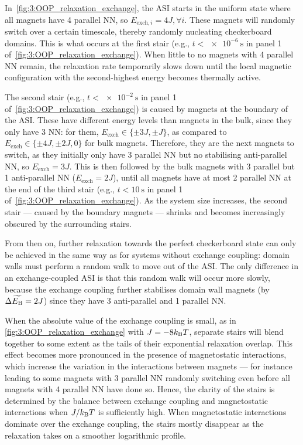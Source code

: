 In~\cref{fig:3:OOP_relaxation_exchange}, the ASI starts in the uniform state where all magnets have 4 parallel NN, so $E_{\mathrm{exch},i} = 4J, \forall i$.
These magnets will randomly switch over a certain timescale, thereby randomly nucleating checkerboard domains.
This is what occurs at the first stair (e.g., $t < \SI{e-6}{\second}$ in panel 1 of~\cref{fig:3:OOP_relaxation_exchange}).
When little to no magnets with 4 parallel NN remain, the relaxation rate temporarily slows down until the local magnetic configuration with the second-highest energy becomes thermally active. \par
The second stair (e.g., $t < \SI{e-2}{\second}$ in panel 1 of~\cref{fig:3:OOP_relaxation_exchange}) is caused by magnets at the boundary of the ASI.
These have different energy levels than magnets in the bulk, since they only have 3 NN: for them, $E_\mathrm{exch} \in \{\pm 3J, \pm J\}$, as compared to $E_\mathrm{exch} \in \{\pm 4J, \pm 2J, 0\}$ for bulk magnets.
Therefore, they are the next magnets to switch, as they initially only have 3 parallel NN but no stabilising anti-parallel NN, so $E_\mathrm{exch} = 3J$.
This is then followed by the bulk magnets with 3 parallel but 1 anti-parallel NN ($E_\mathrm{exch} = 2J$), until all magnets have at most 2 parallel NN at the end of the third stair (e.g., $t < \SI{10}{\second}$ in panel 1 of~\cref{fig:3:OOP_relaxation_exchange}).
As the system size increases, the second stair --- caused by the boundary magnets --- shrinks and becomes increasingly obscured by the surrounding stairs. \par
From then on, further relaxation towards the perfect checkerboard state can only be achieved in the same way as for systems without exchange coupling: domain walls must perform a random walk to move out of the ASI.
The only difference in an exchange-coupled ASI is that this random walk will occur more slowly, because the exchange coupling further stabilises domain wall magnets (by $\Delta \widetilde{E_\mathrm{B}} = 2J$) since they have 3 anti-parallel and 1 parallel NN. \par
When the absolute value of the exchange coupling is small, as in \cref{fig:3:OOP_relaxation_exchange} with $J=-8\kBT$, separate stairs will blend together to some extent as the tails of their exponential relaxation overlap.
This effect becomes more pronounced in the presence of magnetostatic interactions, which increase the variation in the interactions between magnets --- for instance leading to some magnets with 3 parallel NN randomly switching even before all magnets with 4 parallel NN have done so.
Hence, the clarity of the stairs is determined by the balance between exchange coupling and magnetostatic interactions when $J/\kBT$ is sufficiently high.
When magnetostatic interactions dominate over the exchange coupling, the stairs mostly disappear as the relaxation takes on a smoother logarithmic profile.

